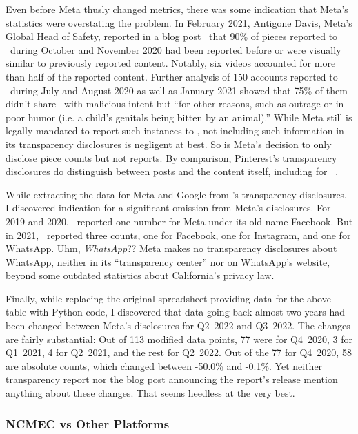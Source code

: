 Even before Meta thusly changed metrics, there was some indication that Meta's
statistics were overstating the problem. In February 2021, Antigone Davis,
Meta's Global Head of Safety, reported in a blog post~\cite{Davis2021} that 90\%
of pieces reported to \NCMEC\ during October and November 2020 had been reported
before or were visually similar to previously reported content. Notably, six
videos accounted for more than half of the reported content. Further analysis of
150 accounts reported to \NCMEC\ during July and August 2020 as well as January
2021 showed that 75\% of them didn't share \CSAM\ with malicious intent but
``for other reasons, such as outrage or in poor humor (i.e. a child's genitals
being bitten by an animal).'' While Meta still is legally mandated to report
such instances to \NCMEC, not including such information in its transparency
disclosures is negligent at best. So is Meta's decision to only disclose piece
counts but not reports. By comparison, Pinterest's transparency disclosures do
distinguish between posts and the content itself, including for
\CSAM~\cite{Pinterest2022}.

While extracting the data for Meta and Google from \NCMEC's transparency
disclosures, I discovered indication for a significant omission from Meta's
disclosures. For 2019 and 2020, \NCMEC\ reported one number for Meta under its
old name Facebook. But in 2021, \NCMEC\ reported three counts, one for Facebook,
one for Instagram, and one for WhatsApp. Uhm, \emph{WhatsApp}?? Meta makes no
transparency disclosures about WhatsApp, neither in its ``transparency center''
nor on WhatsApp's website, beyond some outdated statistics about California's
privacy law.

Finally, while replacing the original spreadsheet providing data for the above
table with Python code, I discovered that data going back almost two years had
been changed between Meta's disclosures for Q2~2022 and Q3~2022. The changes are
fairly substantial: Out of 113 modified data points, 77 were for Q4~2020, 3 for
Q1~2021, 4 for Q2~2021, and the rest for Q2~2022. Out of the 77 for Q4~2020, 58
are absolute counts, which changed between -50.0\% and -0.1\%. Yet neither
transparency report nor the blog post announcing the report's release mention
anything about these changes. That seems heedless at the very best.


\subsubsection{NCMEC vs Other Platforms}

